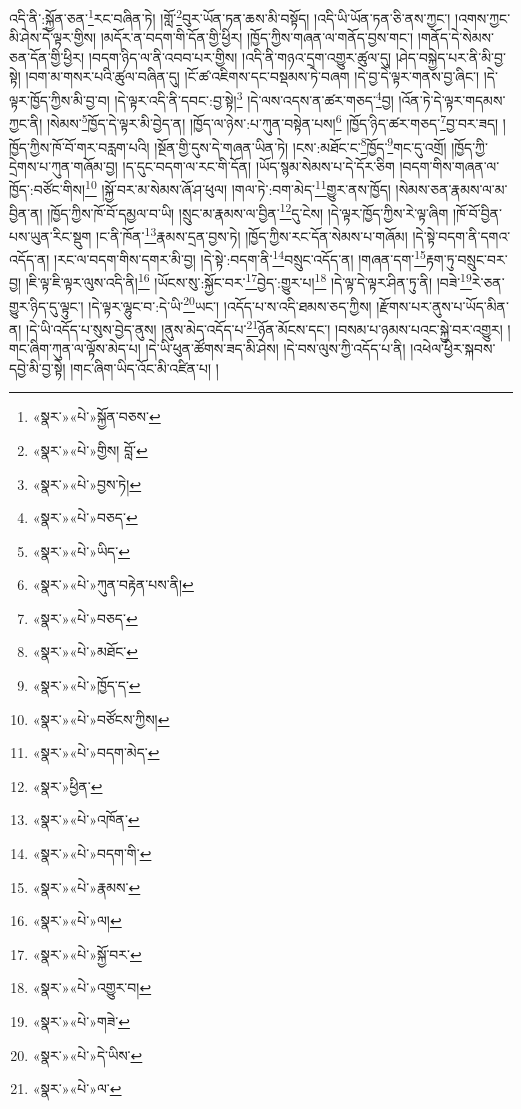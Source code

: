 འདི་ནི་:སྐྱོན་ཅན་\footnote{«སྣར་»«པེ་»སྐྱོན་བཅས་}རང་བཞིན་ཏེ། །གློ་\footnote{«སྣར་»«པེ་»གྱིས། བློ་}བུར་ཡོན་ཏན་ཆས་མི་བསྟོད། །འདི་ཡི་ཡོན་ཏན་ཅི་ནས་ཀྱང་། །འགས་ཀྱང་མི་ཤེས་དེ་ལྟར་གྱིས། །མདོར་ན་བདག་གི་དོན་གྱི་ཕྱིར། །ཁྱོད་ཀྱིས་གཞན་ལ་གནོད་བྱས་གང་། །གནོད་དེ་སེམས་ཅན་དོན་གྱི་ཕྱིར། །བདག་ཉིད་ལ་ནི་འབབ་པར་གྱིས། །འདི་ནི་གཉའ་དྲག་འགྱུར་ཚུལ་དུ། །ཤེད་བསྐྱེད་པར་ནི་མི་བྱ་སྟེ། །བག་མ་གསར་པའི་ཚུལ་བཞིན་དུ། །ངོ་ཚ་འཇིགས་དང་བསྡམས་ཏེ་བཞག །དེ་བྱ་དེ་ལྟར་གནས་བྱ་ཞིང་། །དེ་ལྟར་ཁྱོད་ཀྱིས་མི་བྱ་བ། །དེ་ལྟར་འདི་ནི་དབང་:བྱ་སྟེ།\footnote{«སྣར་»«པེ་»བྱས་ཏེ།} །དེ་ལས་འདས་ན་ཚར་གཅད་\footnote{«སྣར་»«པེ་»བཅད་}བྱ། །འོན་ཏེ་དེ་ལྟར་གདམས་ཀྱང་ནི། །སེམས་\footnote{«སྣར་»«པེ་»ཡིད་}ཁྱོད་དེ་ལྟར་མི་བྱེད་ན། །ཁྱོད་ལ་ཉེས་:པ་ཀུན་བསྟེན་པས།\footnote{«སྣར་»«པེ་»ཀུན་བརྟེན་པས་ནི།} །ཁྱོད་ཉིད་ཚར་གཅད་\footnote{«སྣར་»«པེ་»བཅད་}བྱ་བར་ཟད། །ཁྱོད་ཀྱིས་ཁོ་བོ་གར་བརླག་པའི། །སྔོན་གྱི་དུས་དེ་གཞན་ཡིན་ཏེ། །ངས་:མཐོང་ང་\footnote{«སྣར་»«པེ་»མཐོང་}ཁྱོད་\footnote{«སྣར་»«པེ་»ཁྱོད་ད་}གང་དུ་འགྲོ། །ཁྱོད་ཀྱི་དྲེགས་པ་ཀུན་གཞོམ་བྱ། །ད་དུང་བདག་ལ་རང་གི་དོན། །ཡོད་སྙམ་སེམས་པ་དེ་དོར་ཅིག །བདག་གིས་གཞན་ལ་ཁྱོད་:བཙོང་གིས།\footnote{«སྣར་»«པེ་»བཙོངས་ཀྱིས།} །སྐྱོ་བར་མ་སེམས་ཞོ་ཤ་ཕུལ། །གལ་ཏེ་:བག་མེད་\footnote{«སྣར་»«པེ་»བདག་མེད་}གྱུར་ནས་ཁྱོད། །སེམས་ཅན་རྣམས་ལ་མ་བྱིན་ན། །ཁྱོད་ཀྱིས་ཁོ་བོ་དམྱལ་བ་ཡི། །སྲུང་མ་རྣམས་ལ་བྱིན་\footnote{«སྣར་»ཕྱིན་}དུ་ངེས། །དེ་ལྟར་ཁྱོད་ཀྱིས་རེ་ལྟ་ཞིག །ཁོ་བོ་བྱིན་པས་ཡུན་རིང་སྡུག །ང་ནི་ཁོན་\footnote{«སྣར་»«པེ་»འཁོན་}རྣམས་དྲན་བྱས་ཏེ། །ཁྱོད་ཀྱིས་རང་དོན་སེམས་པ་གཞོམ། །དེ་སྟེ་བདག་ནི་དགའ་འདོད་ན། །རང་ལ་བདག་གིས་དགར་མི་བྱ། །དེ་སྟེ་:བདག་ནི་\footnote{«སྣར་»«པེ་»བདག་གི་}བསྲུང་འདོད་ན། །གཞན་དག་\footnote{«སྣར་»«པེ་»རྣམས་}རྟག་ཏུ་བསྲུང་བར་བྱ། །ཇི་ལྟ་ཇི་ལྟར་ལུས་འདི་ནི།\footnote{«སྣར་»«པེ་»ལ།} །ཡོངས་སུ་:སྐྱོང་བར་\footnote{«སྣར་»«པེ་»སྐྱོ་བར་}བྱེད་:གྱུར་པ།\footnote{«སྣར་»«པེ་»འགྱུར་བ།} །དེ་ལྟ་དེ་ལྟར་ཤིན་ཏུ་ནི། །བཟེ་\footnote{«སྣར་»«པེ་»གཟེ་}རེ་ཅན་གྱུར་ཉིད་དུ་ལྟུང་། །དེ་ལྟར་ལྷུང་བ་:དེ་ཡི་\footnote{«སྣར་»«པེ་»དེ་ཡིས་}ཡང་། །འདོད་པ་ས་འདི་ཐམས་ཅད་ཀྱིས། །རྫོགས་པར་ནུས་པ་ཡོད་མིན་ན། །དེ་ཡི་འདོད་པ་སུས་བྱེད་ནུས། །ནུས་མེད་འདོད་པ་\footnote{«སྣར་»«པེ་»ལ་}ཉོན་མོངས་དང་། །བསམ་པ་ཉམས་པའང་སྐྱེ་བར་འགྱུར། །གང་ཞིག་ཀུན་ལ་ལྟོས་མེད་པ། །དེ་ཡི་ཕུན་ཚོགས་ཟད་མི་ཤེས། །དེ་བས་ལུས་ཀྱི་འདོད་པ་ནི། །འཕེལ་ཕྱིར་སྐབས་དབྱེ་མི་བྱ་སྟེ། །གང་ཞིག་ཡིད་འོང་མི་འཛིན་པ། །
